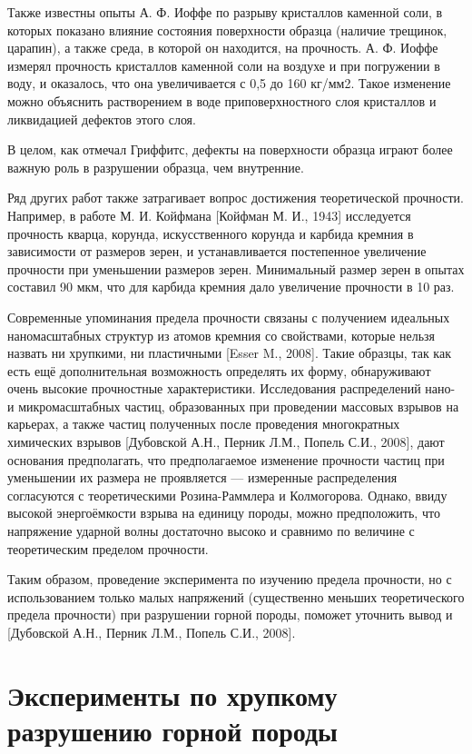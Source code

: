 Также известны опыты А. Ф. Иоффе по разрыву кристаллов каменной соли, в которых показано влияние состояния поверхности образца (наличие трещинок, царапин), а также среда, в которой он находится, на прочность. А. Ф. Иоффе измерял прочность кристаллов каменной соли на воздухе и при погружении в воду, и оказалось, что она увеличивается с 0,5 до 160 кг/мм2. Такое изменение можно объяснить растворением в воде приповерхностного слоя кристаллов и ликвидацией дефектов этого слоя.

В целом, как отмечал Гриффитс, дефекты на поверхности образца играют более важную роль в разрушении образца, чем внутренние.

Ряд других работ также затрагивает вопрос достижения теоретической прочности. Например, в работе М. И. Койфмана [Койфман М. И., 1943] исследуется прочность кварца, корунда, искусственного корунда и карбида кремния в зависимости от размеров зерен, и устанавливается постепенное увеличение прочности при уменьшении размеров зерен. Минимальный размер зерен в опытах составил 90 мкм, что для карбида кремния дало увеличение прочности в 10 раз.

Современные упоминания предела прочности связаны с получением идеальных наномасштабных структур из атомов кремния со свойствами, которые нельзя назвать ни хрупкими, ни пластичными [Esser M., 2008]. Такие образцы, так как есть ещё дополнительная возможность определять их форму, обнаруживают очень высокие прочностные характеристики.
Исследования распределений нано- и микромасштабных частиц, образованных при проведении массовых взрывов на карьерах, а также частиц полученных после проведения многократных химических взрывов [Дубовской А.Н., Перник Л.М., Попель С.И., 2008], дают основания предполагать, что предполагаемое изменение прочности частиц при уменьшении их размера не проявляется — измеренные распределения согласуются с теоретическими Розина-Раммлера и Колмогорова.  Однако, ввиду высокой энергоёмкости взрыва на единицу породы, можно предположить, что напряжение ударной волны достаточно высоко и сравнимо по величине с теоретическим пределом прочности.

Таким образом, проведение эксперимента по изучению предела прочности, но с использованием только малых напряжений (существенно меньших теоретического предела прочности) при разрушении горной породы, поможет уточнить вывод и [Дубовской А.Н., Перник Л.М., Попель С.И., 2008].


\section{Эксперименты по хрупкому разрушению горной породы} \label{sect4_1}

